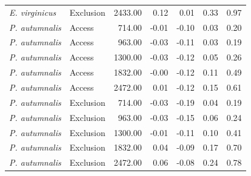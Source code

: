 \begin{tabular}{llrrrrr}
  \textit{E. virginicus} & Exclusion & 2433.00 & 0.12 & 0.01 & 0.33 & 0.97 \\ 
  \textit{P. autumnalis} & Access & 714.00 & -0.01 & -0.10 & 0.03 & 0.20 \\ 
  \textit{P. autumnalis} & Access & 963.00 & -0.03 & -0.11 & 0.03 & 0.19 \\ 
  \textit{P. autumnalis} & Access & 1300.00 & -0.03 & -0.12 & 0.05 & 0.26 \\ 
  \textit{P. autumnalis} & Access & 1832.00 & -0.00 & -0.12 & 0.11 & 0.49 \\ 
  \textit{P. autumnalis} & Access & 2472.00 & 0.01 & -0.12 & 0.15 & 0.61 \\ 
  \textit{P. autumnalis} & Exclusion & 714.00 & -0.03 & -0.19 & 0.04 & 0.19 \\ 
  \textit{P. autumnalis} & Exclusion & 963.00 & -0.03 & -0.15 & 0.06 & 0.24 \\ 
  \textit{P. autumnalis} & Exclusion & 1300.00 & -0.01 & -0.11 & 0.10 & 0.41 \\ 
  \textit{P. autumnalis} & Exclusion & 1832.00 & 0.04 & -0.09 & 0.17 & 0.70 \\ 
  \textit{P. autumnalis} & Exclusion & 2472.00 & 0.06 & -0.08 & 0.24 & 0.78 \\ 
   \hline
\end{tabular}